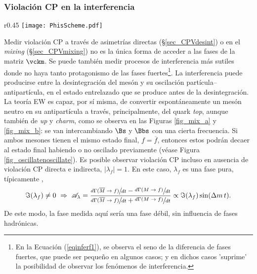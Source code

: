 \subsubsection{Violación CP en la interferencia} %
\label{sec_cpvinter}

\begin{wrapfigure}{r}{0.45\textwidth}
\centering
\texttt{[image: PhisScheme.pdf]}
\caption{Interferencia entre la desintegración directa y la desintegración después de la mezcla.}	\label{fig_oscillatenoscillate}
\end{wrapfigure}
Medir violación CP a través de asimetrías directas (\S \ref{sec_CPVdesint}) o en el \emph{mixing} (\S \ref{sec_CPVmixing}) no es la única forma de acceder a las fases de la matriz $\vckm$. Se puede también medir procesos de interferencia más sutiles donde no haya tanto protagonismo de las fases fuertes\footnote{\color{vero}En la Ecuación (\ref{eqinferf1}), se observa el seno de la diferencia de fases fuertes, que puede ser pequeño en algunos casos; y en dichos casos 'suprime' la posibilidad de observar los fenómenos de interferencia. \color{norm}}.
%
La interferencia puede producirse entre la desintegración del mesón y su oscilación partícula--antipartícula, en el estado entrelazado que se produce antes de la desintegración.
%
La teoría EW es capaz, por sí misma, de convertir espontáneamente un mesón neutro en su antipartícula a través, principalmente, del quark \textit{top}, aunque también de \emph{up} y \emph{charm}, como se observa en las Figuras \ref{fig_mix_a} y \ref{fig_mix_b}: se van intercambiando $\Bs$ y $\Bbs$ con una cierta frecuencia. Si ambos mesones tienen el mismo estado final, $f = \overline{f}$,  entonces estos podrán decaer al estado final habiendo o no oscilado previamente (véase Figura \ref{fig_oscillatenoscillate}).
%
Es posible observar violación CP incluso en ausencia de violación CP directa e indirecta, $|\lambda_f| = 1$. En este caso, $\lambda_f$ es una fase pura, típicamente \cite{pdg2018}, 
\begin{equation}
	\Im(\lambda_f) \neq 0  \,\, \Rightarrow \,\, \mathscr{A}_{\lambda} = \frac{
	\sfrac{d{\Gamma}(\overline{M}\rightarrow f )}{dt}-\sfrac{d\Gamma({M}\rightarrow f )}{dt}}{
	\sfrac{d{\Gamma(\overline{M}\rightarrow f )}}{dt}+\sfrac{d\Gamma({M}\rightarrow f )}{dt}} \propto \Im (\lambda_f) \sin (\Delta m \, t). \label{eq_alanda}
\end{equation}
%
De este modo, la fase medida aquí sería una fase débil, sin influencia de fases hadrónicas.



